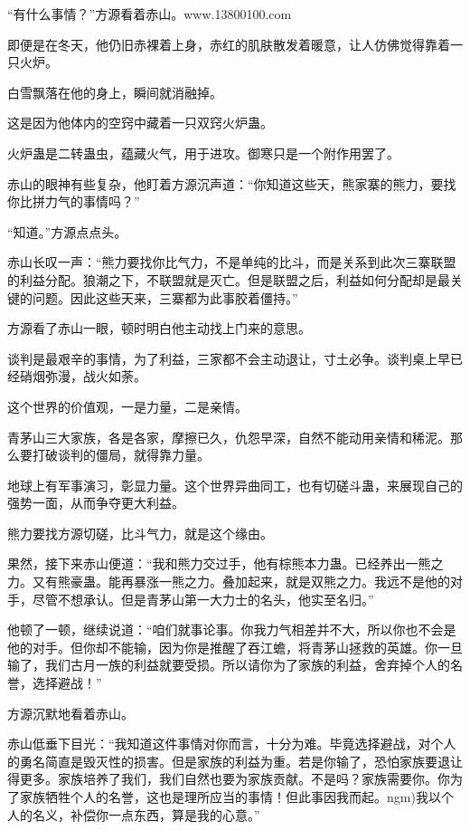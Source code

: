 
\begin{this_body}

“有什么事情？”方源看着赤山。www.13800100.com

即便是在冬天，他仍旧赤裸着上身，赤红的肌肤散发着暖意，让人仿佛觉得靠着一只火炉。

白雪飘落在他的身上，瞬间就消融掉。

这是因为他体内的空窍中藏着一只双窍火炉蛊。

火炉蛊是二转蛊虫，蕴藏火气，用于进攻。御寒只是一个附作用罢了。

赤山的眼神有些复杂，他盯着方源沉声道：“你知道这些天，熊家寨的熊力，要找你比拼力气的事情吗？”

“知道。”方源点点头。

赤山长叹一声：“熊力要找你比气力，不是单纯的比斗，而是关系到此次三寨联盟的利益分配。狼潮之下，不联盟就是灭亡。但是联盟之后，利益如何分配却是最关键的问题。因此这些天来，三寨都为此事胶着僵持。”

方源看了赤山一眼，顿时明白他主动找上门来的意思。

谈判是最艰辛的事情，为了利益，三家都不会主动退让，寸土必争。谈判桌上早已经硝烟弥漫，战火如荼。

这个世界的价值观，一是力量，二是亲情。

青茅山三大家族，各是各家，摩擦已久，仇怨早深，自然不能动用亲情和稀泥。那么要打破谈判的僵局，就得靠力量。

地球上有军事演习，彰显力量。这个世界异曲同工，也有切磋斗蛊，来展现自己的强势一面，从而争夺更大利益。

熊力要找方源切磋，比斗气力，就是这个缘由。

果然，接下来赤山便道：“我和熊力交过手，他有棕熊本力蛊。已经养出一熊之力。又有熊豪蛊。能再暴涨一熊之力。叠加起来，就是双熊之力。我远不是他的对手，尽管不想承认。但是青茅山第一大力士的名头，他实至名归。”

他顿了一顿，继续说道：“咱们就事论事。你我力气相差并不大，所以你也不会是他的对手。但你却不能输，因为你是推醒了吞江蟾，将青茅山拯救的英雄。你一旦输了，我们古月一族的利益就要受损。所以请你为了家族的利益，舍弃掉个人的名誉，选择避战！”

方源沉默地看着赤山。

赤山低垂下目光：“我知道这件事情对你而言，十分为难。毕竟选择避战，对个人的勇名简直是毁灭性的损害。但是家族的利益为重。若是你输了，恐怕家族要退让得更多。家族培养了我们，我们自然也要为家族贡献。不是吗？家族需要你。你为了家族牺牲个人的名誉，这也是理所应当的事情！但此事因我而起。ngm)我以个人的名义，补偿你一点东西，算是我的心意。”


\end{this_body}

